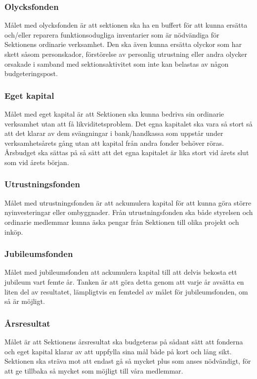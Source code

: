 \documentclass[10pt]{article}
\begin{document}
        \subsubsection*{Olycksfonden}
        Målet med olycksfonden är att sektionen ska ha en buffert för att kunna ersätta och/eller reparera funktionsodugliga inventarier som är nödvändiga för Sektionens ordinarie verksamhet. Den ska även kunna ersätta olyckor som har skett såsom personskador, förstörelse av personlig utrustning eller andra olycker orsakade i samband med sektionsaktivitet som inte kan belastas av någon budgeteringspost.
        
        \subsubsection*{Eget kapital}
        Målet med eget kapital är att Sektionen ska kunna bedriva sin ordinarie verksamhet utan att få likviditetsproblem. Det egna kapitalet ska vara så stort så att det klarar av dem svängningar i bank/handkassa som uppstår under verksamhetsårets gång utan att kapital från andra fonder behöver röras. Årsbudget ska sättas på så sätt att det egna kapitalet är lika stort vid årets slut som vid årets början.
        
        \subsubsection*{Utrustningsfonden}
        Målet med utrustningsfonden är att ackumulera kapital för att kunna göra större nyinvesteringar eller ombyggnader. Från utrustningsfonden ska både styrelsen och ordinarie medlemmar kunna äska pengar från Sektionen till olika projekt och inköp. 
    
        \subsubsection*{Jubileumsfonden}
        Målet med jubileumsfonden att ackumulera kapital till att delvis bekosta ett jubileum vart femte år. Tanken är att göra detta genom att varje år avsätta en liten del av resultatet, lämpligtvis en femtedel av målet för jubileumsfonden, om så är möjligt. 
    
        \subsubsection*{Årsresultat}
        Målet är att Sektionens årsresultat ska budgeteras på sådant sätt att fonderna och eget kapital klarar av att uppfylla sina mål både på kort och lång sikt. Sektionen ska sträva mot att endast gå så mycket plus som anses nödvändigt, för att ge tillbaka så mycket som möjligt till våra medlemmar.
        
\end{document}
